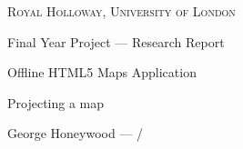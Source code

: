 


{
\centering
{\scshape\large Royal Holloway, University of London\par}
\vspace{0.5cm}
{\Huge Final Year Project --- Research Report\par}
\vspace{0.2cm}
{\Large Offline HTML5 Maps Application\par}
\vspace{0.2cm}
{\Huge Projecting a map\par}
\vspace{0.5cm}
{\large George Honeywood --- \the\month/\the\year\par}
\vspace{0.5cm}
}



\printbibliography{}

